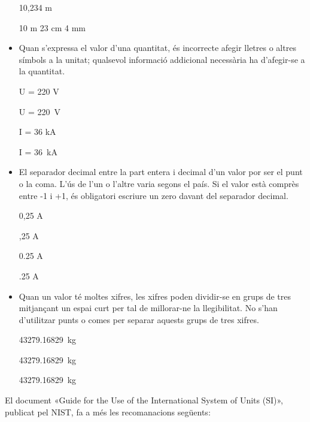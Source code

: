 \begin{itemize}
\textcolor{Green}\faCheckSquare{} 10,234 m

\textcolor{Red}\faTimesCircle{}  10 m 23 cm 4 mm


\item Quan s'expressa el valor d'una quantitat, és incorrecte afegir
lletres o altres símbols a la unitat; qualsevol informació
addicional necessària ha d'afegir-se a la quantitat.

\textcolor{Green}\faCheckSquare{} U = 220 V

\textcolor{Red}\faTimesCircle{}  U = \SI{220}{V}

\textcolor{Green}\faCheckSquare{}  I = 36 kA

\textcolor{Red}\faTimesCircle{}   I = \SI{36}{kA}


\item El separador decimal entre la part entera i decimal d'un valor por ser el punt o la coma. L'ús de l'un o l'altre varia segons el país. Si el valor està comprès entre -1 i +1, és obligatori escriure un zero davant del separador decimal.

\textcolor{Green}\faCheckSquare{} 0,25 A

\textcolor{Red}\faTimesCircle{}  ,25 A

\textcolor{Green}\faCheckSquare{} 0.25 A

\textcolor{Red}\faTimesCircle{}  .25 A


\item Quan un valor té moltes xifres, les xifres poden dividir-se en grups de tres mitjançant un espai curt per tal de millorar-ne la llegibilitat. No s'han d'utilitzar punts o comes per separar aquests grups de tres xifres.

\textcolor{Green}\faCheckSquare{} \SI{43279,16829}{kg}

\textcolor{Green}\faCheckSquare{} \SI[group-separator =]{43279,16829}{kg}

\textcolor{Red}\faTimesCircle{}  \SI[group-separator = .]{43279,16829}{kg}

\end{itemize}

El document  «Guide for the Use of the International System of Units (SI)», publicat pel NIST,  fa a més les recomanacions següents:

